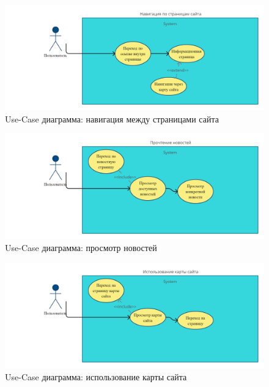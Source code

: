 \begin{figure}
      \includegraphics[width=16cm]{4-actions/Navigation.jpg}
      \centering
      \caption{Use-Case диаграмма: навигация между страницами сайта}
\end{figure}

\begin{figure}
      \includegraphics[width=16cm]{4-actions/News.jpg}
      \centering
      \caption{Use-Case диаграмма: просмотр новостей}
\end{figure}

\begin{figure}
      \includegraphics[width=16cm]{4-actions/App_map.jpg}
      \centering
      \caption{Use-Case диаграмма: использование карты сайта}
\end{figure}

